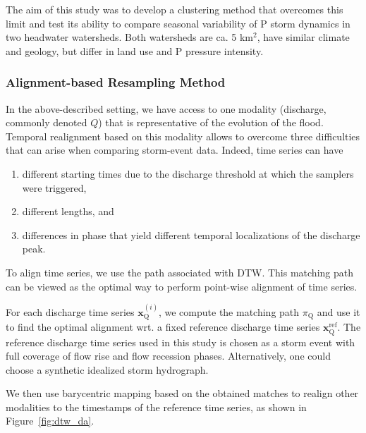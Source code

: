 The aim of this study was to develop a clustering method that overcomes this
limit and test its ability to compare seasonal variability of P storm dynamics
in two headwater watersheds. Both watersheds are ca. 5 km$^2$, have similar
climate and geology, but differ in land use and P pressure intensity.

\subsubsection{Alignment-based Resampling Method}

In the above-described setting, we have access to one modality (discharge,
commonly denoted $Q$) that is representative of the evolution of the flood.
Temporal realignment based on this modality allows to overcome three
difficulties that can arise when comparing storm-event data.
Indeed, time series can have

\begin{enumerate}
\item different starting times due to the discharge threshold at which the
samplers were triggered,
\item different lengths, and
\item differences in phase that yield different temporal localizations of the
discharge peak.
\end{enumerate}

To align time series, we use the path associated with DTW.
This matching path can be viewed as the optimal way to perform point-wise
alignment of time series.

For each discharge time series $\mathbf{x}^{(i)}_\text{Q}$, we compute the
matching path $\pi_\text{Q}$ and use it to find the optimal alignment wrt.
a fixed reference discharge time series $\mathbf{x}^\text{ref}_\text{Q}$.
The reference discharge time series used in this study is chosen
as a storm event with full coverage of flow rise and flow recession phases.
Alternatively, one could choose a synthetic idealized storm hydrograph.

We then use barycentric mapping based on the obtained matches to realign other
modalities to the timestamps of the reference time series, as shown in
Figure~\ref{fig:dtw_da}.

